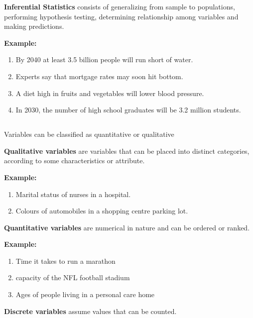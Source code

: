 \documentclass[12pt,a4paper,openany]{book}
\begin{document}
\textbf{Inferential Statistics} consists of generalizing 
from sample to populations, performing hypothesis testing, 
determining relationship among variables and making predictions.

\textbf{Example:}
\begin{enumerate}
\item By 2040 at least 3.5 billion people will run 
      short of water.
\item Experts say that mortgage rates may soon hit bottom.
\item A diet high in fruits and vegetables will lower 
      blood pressure.
\item In 2030, the number of high school graduates 
      will be 3.2 million students.
\end{enumerate}

\subsection{}

Variables can be classified as quantitative or qualitative

\begin{mdframed}
\textbf{Qualitative variables }are variables that 
can be placed into distinct categories,
according to some characteristics or attribute.
\end{mdframed}

\textbf{Example:}
\begin{enumerate}
\item Marital status of nurses in a hospital.
\item Colours of automobiles in a shopping centre 
parking lot.
\end{enumerate}

\begin{mdframed}
\textbf{Quantitative variables} are numerical in nature 
and can be ordered or ranked.
\end{mdframed}

\textbf{Example:}
\begin{enumerate}
\item Time it takes to run a marathon
\item capacity of the NFL football stadium
\item  Ages of people living in a personal care home
\end{enumerate}

\begin{mdframed}
\textbf{Discrete variables} assume values that can be 
counted.
\end{mdframed}
\end{document}
